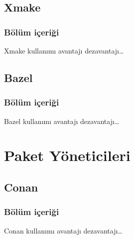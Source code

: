 \documentclass[
]{book}
\begin{document}
\hypertarget{xmake}{%
\chapter*{Xmake}\label{xmake}}

\hypertarget{buxf6luxfcm-iuxe7eriux11fi-9}{%
\section*{Bölüm içeriği}\label{buxf6luxfcm-iuxe7eriux11fi-9}}

Xmake kullanımı avantajı dezavantajı\ldots{}

\hypertarget{bazel}{%
\chapter*{Bazel}\label{bazel}}

\hypertarget{buxf6luxfcm-iuxe7eriux11fi-10}{%
\section*{Bölüm içeriği}\label{buxf6luxfcm-iuxe7eriux11fi-10}}

Bazel kullanımı avantajı dezavantajı\ldots{}

\hypertarget{part-paket-yuxf6neticileri}{%
\part{Paket Yöneticileri}\label{part-paket-yuxf6neticileri}}

\hypertarget{conan}{%
\chapter*{Conan}\label{conan}}

\hypertarget{buxf6luxfcm-iuxe7eriux11fi-11}{%
\section*{Bölüm içeriği}\label{buxf6luxfcm-iuxe7eriux11fi-11}}

Conan kullanımı avantajı dezavantajı\ldots{}
\end{document}
